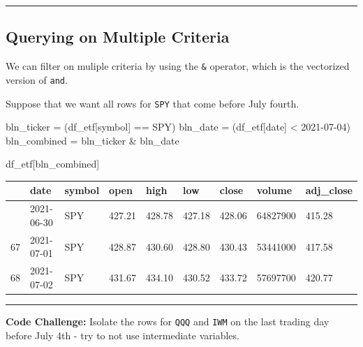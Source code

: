 \documentclass[
  letterpaper,
  DIV=11,
  numbers=noendperiod]{scrreprt}
\newenvironment{Shaded}{\begin{snugshade}}{\end{snugshade}}
\newcommand{\NormalTok}[1]{\textcolor[rgb]{0.00,0.23,0.31}{#1}}
\newcommand{\OperatorTok}[1]{\textcolor[rgb]{0.37,0.37,0.37}{#1}}
\newcommand{\StringTok}[1]{\textcolor[rgb]{0.13,0.47,0.30}{#1}}
\begin{document}
\begin{center}\rule{0.5\linewidth}{0.5pt}\end{center}

\hypertarget{querying-on-multiple-criteria}{%
\subsection{Querying on Multiple
Criteria}\label{querying-on-multiple-criteria}}

We can filter on muliple criteria by using the \texttt{\&} operator,
which is the vectorized version of \texttt{and}.

Suppose that we want all rows for \texttt{SPY} that come before July
fourth.

\begin{Shaded}
\begin{Highlighting}[]
\NormalTok{bln\_ticker }\OperatorTok{=}\NormalTok{ (df\_etf[}\StringTok{\textquotesingle{}symbol\textquotesingle{}}\NormalTok{] }\OperatorTok{==} \StringTok{\textquotesingle{}SPY\textquotesingle{}}\NormalTok{)}
\NormalTok{bln\_date }\OperatorTok{=}\NormalTok{ (df\_etf[}\StringTok{\textquotesingle{}date\textquotesingle{}}\NormalTok{] }\OperatorTok{\textless{}} \StringTok{\textquotesingle{}2021{-}07{-}04\textquotesingle{}}\NormalTok{)}
\NormalTok{bln\_combined }\OperatorTok{=}\NormalTok{ bln\_ticker }\OperatorTok{\&}\NormalTok{ bln\_date}

\NormalTok{df\_etf[bln\_combined]}
\end{Highlighting}
\end{Shaded}

\begin{longtable}[]{@{}lllllllll@{}}
\toprule\noalign{}
& date & symbol & open & high & low & close & volume & adj\_close \\
\midrule\noalign{}
\endhead
\bottomrule\noalign{}
\endlastfoot
66 & 2021-06-30 & SPY & 427.21 & 428.78 & 427.18 & 428.06 & 64827900 &
415.28 \\
67 & 2021-07-01 & SPY & 428.87 & 430.60 & 428.80 & 430.43 & 53441000 &
417.58 \\
68 & 2021-07-02 & SPY & 431.67 & 434.10 & 430.52 & 433.72 & 57697700 &
420.77 \\
\end{longtable}

\begin{center}\rule{0.5\linewidth}{0.5pt}\end{center}

\textbf{Code Challenge:} Isolate the rows for \texttt{QQQ} and
\texttt{IWM} on the last trading day before July 4th - try to not use
intermediate variables.
\end{document}
